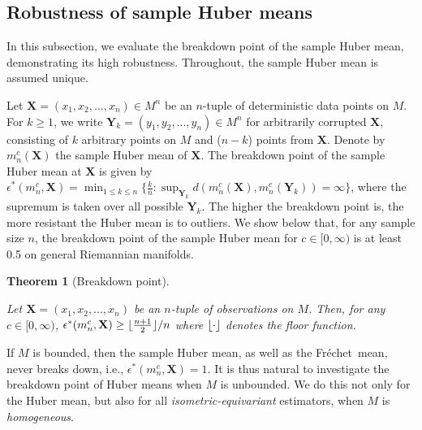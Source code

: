 \documentclass[preprint]{imsart}
\DeclarePairedDelimiter\floor{\lfloor}{\rfloor}
\newcommand{\bX}{\mathbf{X}}
\newcommand{\bY}{\mathbf{Y}}
\def\Frechet{Fr\'{e}chet}
\theoremstyle{plain}
\newtheorem{theorem}{Theorem}
\theoremstyle{remark}
\begin{document}

   
\subsection{Robustness of sample Huber means}\label{sec:robust}
In this subsection, 
we evaluate the breakdown point of the sample Huber mean, demonstrating its high robustness. Throughout, the sample Huber mean is assumed unique.


Let $\bX= (x_{1}, x_{2}, ..., x_{n}) \in M^{n}$ be an $n$-tuple of deterministic data points on $M$. For $k \ge 1$, we write $\bY_{k}= (y_{1}, y_{2}, ..., y_{n}) \in M^{n}$ for arbitrarily corrupted $\bX$, consisting of $k$ arbitrary points on $M$ and ($n-k$) points from $\bX$. Denote by $m^{c}_{n}(\bX)$ the sample Huber mean of $\bX$. The breakdown point of the sample Huber mean at $\bX$ is given by $\epsilon^{*}(m^{c}_{n}, \bX) = \min_{1\le k\le n}\{\frac{k}{n}: \sup_{\bY_{k}} d(m^{c}_{n}(\bX), m^{c}_{n}(\bY_{k})) = \infty \}$,
where the supremum is taken over all possible $\bY_{k}$. The higher the breakdown point is, the more resistant the Huber mean is to outliers. We show below that, for any sample size $n$, the breakdown point of the sample Huber mean for $c \in [0, \infty)$ is at least 0.5 on general Riemannian manifolds. 

\begin{theorem}[Breakdown point]\label{thm:robust:breakdown}
 
Let $\bX= (x_{1}, x_{2}, ..., x_{n})$ be an $n$-tuple of observations on $M$. Then, for any $c \in [0, \infty)$, $\epsilon^{*}(m^{c}_{n}, \bX) \ge \floor{\frac{n+1}{2}}/n$ where $\floor{\cdot}$ denotes the floor function.
\end{theorem}

 

If $M$ is bounded, then the sample Huber mean, as well as the \Frechet\ mean, never breaks down, i.e., $\epsilon^{*}(m^{c}_{n}, \bX) =1$. It is thus natural to investigate the breakdown point of Huber means when $M$ is unbounded. We do this not only for the Huber mean, but also for all \emph{isometric-equivariant} estimators, when $M$ is \emph{homogeneous}. 
\end{document}
